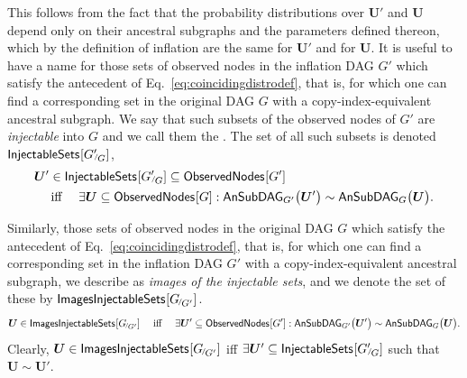 This follows from the fact that the probability distributions over $\bm{U}'$ and $\bm{U}$ depend only on their ancestral subgraphs and the parameters defined thereon, which by the definition of inflation are the same for $\bm{U}'$ and for $\bm{U}$.
It is useful to have a name for those sets of observed nodes in the inflation DAG $G'$ which satisfy the antecedent of Eq.~\eqref{eq:coincidingdistrodef}, that is, for which one can find a corresponding set in the original DAG $G$ with a copy-index-equivalent ancestral subgraph.  We say that such subsets of the observed nodes of $G'$ are {\em injectable} into $G$ and we call them the .  The set of all such subsets is denoted $\SmallNamedFunction{InjectableSets}{{G'}_{\!\!^{/\!}G}}$,
\begin{align}\begin{split}\label{eq:definjectable}
&\bm{U}'\in\SmallNamedFunction{InjectableSets}{{G'}_{\!\!^{/\!}G}} \subseteq \SmallNamedFunction{ObservedNodes}{G'} \\
&\quad\text{ iff }\quad \exists \bm{U}\subseteq \SmallNamedFunction{ObservedNodes}{G}: \ansubgraph[G']{\bm{U}'}\sim\ansubgraph[G]{\bm{U}}.
\end{split}\end{align}

Similarly,  those sets of observed nodes in the original DAG $G$ which satisfy the antecedent of Eq.~\eqref{eq:coincidingdistrodef}, that is, for which one can find a corresponding set in the inflation DAG $G'$ with a copy-index-equivalent ancestral subgraph, we describe as {\em images of the injectable sets}, and we denote the set of these by $\SmallNamedFunction{ImagesInjectableSets}{{G}_{\!^{/\!}G'}}$.
\begin{align}\begin{split}\label{eq:defimageinjectable}
\bm{U}\in\SmallNamedFunction{ImagesInjectableSets}{{G}_{\!^{/\!}G'}}\quad\text{ iff }\quad \exists \bm{U}' \subseteq \SmallNamedFunction{ObservedNodes}{G'}: \ansubgraph[G']{\bm{U}'}\sim\ansubgraph[G]{\bm{U}}.
\end{split}\end{align}
Clearly, $\bm{U}\in\SmallNamedFunction{ImagesInjectableSets}{{G}_{\!^{/\!}G'}}$ iff $\exists \bm{U}' \subseteq \SmallNamedFunction{InjectableSets}{{G'}_{\!\!^{/\!}G}}$ such that $\bm{U}\sim \bm{U}'$.


